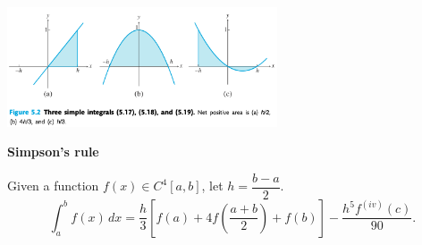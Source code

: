 \documentclass[12pt,letterpaper,noanswers]{exam}
\begin{document}
    \includegraphics[width=0.6\textwidth]{img/Class12Sauerintegrals.png}
\begin{enumerate}[resume=classQ]
    
    
\end{enumerate}
\begin{tcolorbox}
\noindent\textbf{Simpson's rule}

Given a function $f(x) \in C^4[a,b]$, let $h = \dfrac{b-a}{2}$.
\[
          \int_{a}^{b} f(x) \, dx = \frac{h}{3}\left[ f(a)+4f\left(\dfrac{a+b}{2}\right) + f(b) \right]
          - \frac{h^5f^{(iv)}(c)}{90}.\]
\end{tcolorbox}
\end{document}
